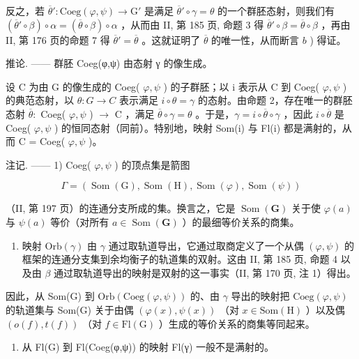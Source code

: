 反之，若 \(\overline{\theta}'\colon \mathrm{Coeg}(\varphi,\psi)\to \mathrm{G}'\) 是满足 \(\overline{\theta}'\circ\gamma=\theta\) 的一个群胚态射，则我们有 \((\overline{\theta}'\circ\beta)\circ\alpha=(\overline{\theta}\circ\beta)\circ\alpha\) ，从而由 II, 第 185 页, 命题 3 得 \(\overline{\theta}'\circ\beta=\overline{\theta}\circ\beta\) ，再由 II, 第 176 页的命题 7 得 \(\overline{\theta}'=\overline{\theta}\) 。这就证明了 \(\overline{\theta}\) 的唯一性，从而断言 \(b\) ) 得证。

推论. —— 群胚 Coeg(φ,ψ) 由态射 γ 的像生成。

设 C 为由 G 的像生成的 Coeg( \(\varphi,\psi\) ) 的子群胚；以 i 表示从 C 到 Coeg( \(\varphi,\psi\) ) 的典范态射，以 \(\theta\colon G\to C\) 表示满足 \(i\circ\theta=\gamma\) 的态射。由命题 2，存在唯一的群胚态射 \(\overline{\theta}\colon\) Coeg( \(\varphi,\psi\) ) \(\to\) C ，满足 \(\overline{\theta}\circ\gamma=\theta\) 。于是，\(\gamma=i\circ\overline{\theta}\circ\gamma\) ，因此 \(i\circ\overline{\theta}\) 是 Coeg( \(\varphi,\psi\) ) 的恒同态射（同前）。特别地，映射 Som(i) 与 Fl(i) 都是满射的，从而 C = Coeg( \(\varphi,\psi\) )。

注记. —— 1) Coeg( \(\varphi,\psi\) ) 的顶点集是箭图

\[
\Gamma = (\operatorname{Som} (\mathrm{G}), \operatorname{Som} (\mathrm{H}), \operatorname{Som} (\varphi), \operatorname{Som} (\psi))
\]

（II, 第 197 页）的连通分支所成的集。换言之，它是 \(\operatorname{Som}(\mathbf{G})\) 关于使 \(\varphi(a)\) 与 \(\psi(a)\) 等价（对所有 \(a \in \operatorname{Som}(\mathbf{G})\) ）的最细等价关系的商集。

\begin{enumerate}
\def\labelenumi{\arabic{enumi})}
\setcounter{enumi}{1}
\tightlist
\item
  映射 \(\mathrm{Orb}(\gamma)\) 由 \(\gamma\) 通过取轨道导出，它通过取商定义了一个从偶 \((\varphi,\psi)\) 的框架的连通分支集到余均衡子的轨道集的双射。这由 II, 第 185 页, 命题 4 以及由 \(\beta\) 通过取轨道导出的映射是双射的这一事实（II, 第 170 页, 注 1）得出。
\end{enumerate}

因此，从 Som(G) 到 \(\mathrm{Orb}(\mathrm{Coeg}(\varphi,\psi))\) 的、由 \(\gamma\) 导出的映射把 \(\mathrm{Coeg}(\varphi,\psi)\) 的轨道集与 Som(G) 关于由偶 \((\varphi(x),\psi(x))\) （对 \(x\in\mathrm{Som(H)}\) ）以及偶 \((o(f),t(f))\) （对 \(f\in\mathrm{Fl(G)}\) ）生成的等价关系的商集等同起来。

\begin{enumerate}
\def\labelenumi{\arabic{enumi})}
\setcounter{enumi}{2}
\tightlist
\item
  从 Fl(G) 到 Fl(Coeg(φ,ψ)) 的映射 Fl(γ) 一般不是满射的。
\end{enumerate}

